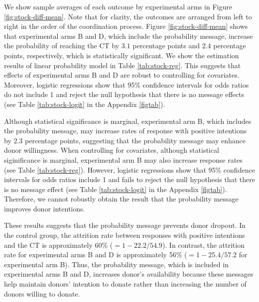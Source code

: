 \documentclass[12pt, a4paper]{article}
\begin{document}
We show sample averages of each outcome by experimental arms in Figure \ref{fig:stock-diff-mean}. Note that for clarity, the outcomes are arranged from left to right in the order of the coordination process. Figure \ref{fig:stock-diff-mean} shows that experimental arms B and D, which include the probability message, increase the probability of reaching the CT by \(3.1\) percentage points and \(2.4\) percentage points, respectively, which is statistically significant. We show the estimation results of linear probability model in Table \ref{tab:stock-reg}. This suggests that effects of experimental arms B and D are robust to controlling for covariates. Moreover, logistic regressions show that 95\% confidence intervals for odds ratios do not include 1 and reject the null hypothesis that there is no message effects (see Table \ref{tab:stock-logit} in the Appendix \ref{figtab}).

Although statistical significance is marginal, experimental arm B, which includes the probability message, may increase rates of response with positive intentions by \(2.3\) percentage points, suggesting that the probability message may enhance donor willingness. When controlling for covariates, although statistical siginificance is marginal, experimental arm B may also increase response rates (see Table \ref{tab:stock-reg}). However, logistic regressions show that 95\% confidence intervals for odds ratios include 1 and fails to reject the null hypothesis that there is no message effect (see Table \ref{tab:stock-logit} in the Appendix \ref{figtab}). Therefore, we cannot robustly obtain the result that the probability message improves donor intentions.

These results suggests that the probability message prevents donor dropout. In the control group, the attrition rate between responses with positive intentions and the CT is approximately 60\% (\(=1 - 22.2/54.9\)). In contrast, the attrition rate for experimental arms B and D is approximately 56\% (\(=1 - 25.4/57.2\) for experimental arm B). Thus, the probability message, which is included in experimental arms B and D, increases donor's availability because these messages help maintain donors' intention to donate rather than increasing the number of donors willing to donate.
\end{document}
